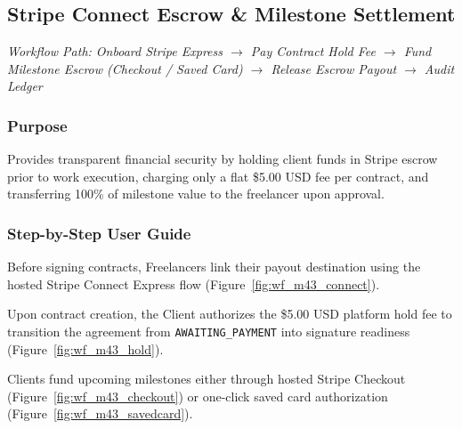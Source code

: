 

\subsection{Stripe Connect Escrow \& Milestone Settlement}
\noindent\textit{Workflow Path: Onboard Stripe Express $\rightarrow$ Pay Contract Hold Fee $\rightarrow$ Fund Milestone Escrow (Checkout / Saved Card) $\rightarrow$ Release Escrow Payout $\rightarrow$ Audit Ledger}

\subsubsection{Purpose}
Provides transparent financial security by holding client funds in Stripe escrow prior to work execution, charging only a flat \$5.00 USD fee per contract, and transferring 100\% of milestone value to the freelancer upon approval.

\subsubsection{Step-by-Step User Guide}

Before signing contracts, Freelancers link their payout destination using the hosted Stripe Connect Express flow (Figure~\ref{fig:wf_m43_connect}).


Upon contract creation, the Client authorizes the \$5.00 USD platform hold fee to transition the agreement from \texttt{AWAITING\_PAYMENT} into signature readiness (Figure~\ref{fig:wf_m43_hold}).


Clients fund upcoming milestones either through hosted Stripe Checkout (Figure~\ref{fig:wf_m43_checkout}) or one-click saved card authorization (Figure~\ref{fig:wf_m43_savedcard}).


